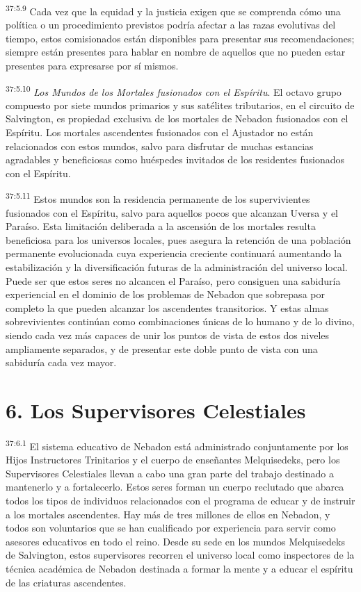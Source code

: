 \par
\textsuperscript{37:5.9} Cada vez que la equidad y la justicia exigen que se comprenda cómo una política o un procedimiento previstos podría afectar a las razas evolutivas del tiempo, estos comisionados están disponibles para presentar sus recomendaciones; siempre están presentes para hablar en nombre de aquellos que no pueden estar presentes para expresarse por sí mismos.

\par
\textsuperscript{37:5.10} \textit{Los Mundos de los Mortales fusionados con el Espíritu}. El octavo grupo compuesto por siete mundos primarios y sus satélites tributarios, en el circuito de Salvington, es propiedad exclusiva de los mortales de Nebadon fusionados con el Espíritu. Los mortales ascendentes fusionados con el Ajustador no están relacionados con estos mundos, salvo para disfrutar de muchas estancias agradables y beneficiosas como huéspedes invitados de los residentes fusionados con el Espíritu.

\par
\textsuperscript{37:5.11} Estos mundos son la residencia permanente de los supervivientes fusionados con el Espíritu, salvo para aquellos pocos que alcanzan Uversa y el Paraíso. Esta limitación deliberada a la ascensión de los mortales resulta beneficiosa para los universos locales, pues asegura la retención de una población permanente evolucionada cuya experiencia creciente continuará aumentando la estabilización y la diversificación futuras de la administración del universo local. Puede ser que estos seres no alcancen el Paraíso, pero consiguen una sabiduría experiencial en el dominio de los problemas de Nebadon que sobrepasa por completo la que pueden alcanzar los ascendentes transitorios. Y estas almas sobrevivientes continúan como combinaciones únicas de lo humano y de lo divino, siendo cada vez más capaces de unir los puntos de vista de estos dos niveles ampliamente separados, y de presentar este doble punto de vista con una sabiduría cada vez mayor.

\section*{6. Los Supervisores Celestiales}
\par
\textsuperscript{37:6.1} El sistema educativo de Nebadon está administrado conjuntamente por los Hijos Instructores Trinitarios y el cuerpo de enseñantes Melquisedeks, pero los Supervisores Celestiales llevan a cabo una gran parte del trabajo destinado a mantenerlo y a fortalecerlo. Estos seres forman un cuerpo reclutado que abarca todos los tipos de individuos relacionados con el programa de educar y de instruir a los mortales ascendentes. Hay más de tres millones de ellos en Nebadon, y todos son voluntarios que se han cualificado por experiencia para servir como asesores educativos en todo el reino. Desde su sede en los mundos Melquisedeks de Salvington, estos supervisores recorren el universo local como inspectores de la técnica académica de Nebadon destinada a formar la mente y a educar el espíritu de las criaturas ascendentes.

